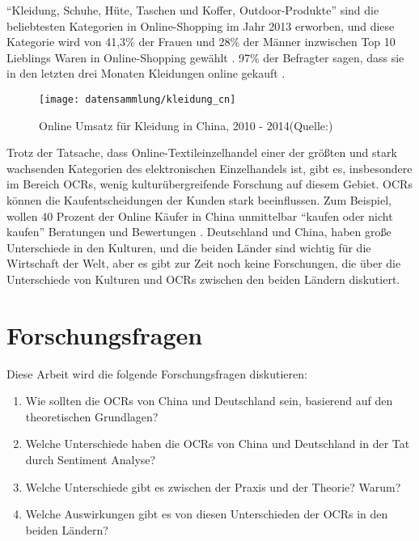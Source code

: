 ``Kleidung, Schuhe, Hüte, Taschen und Koffer, Outdoor-Produkte'' sind die beliebtesten Kategorien in Online-Shopping im Jahr 2013 erworben, und diese Kategorie wird von 41,3\% der Frauen und 28\% der Männer inzwischen Top 10 Lieblings Waren in Online-Shopping gewählt \citep{fung2014china}. 97\% der Befragter sagen, dass sie in den letzten drei Monaten Kleidungen online gekauft \citep{HanaBen-Shabat2015}.

\begin{figure}[htb]
	\begin{center}
		\texttt{[image: datensammlung/kleidung\_cn]}
		\caption[Online Umsatz für Kleidung in China]{Online Umsatz für Kleidung in China, 2010 - 2014(Quelle:\citealp{fung2014china})}
		\label{fig:kleidung_cn}
	\end{center}
\end{figure}

Trotz der Tatsache, dass Online-Textileinzelhandel einer der größten und stark wachsenden Kategorien des elektronischen Einzelhandels ist, gibt es, insbesondere im Bereich \acl{OCRs}, wenig kulturübergreifende Forschung auf diesem Gebiet. \ac{OCRs} können die Kaufentscheidungen der Kunden stark beeinflussen. Zum Beispiel, wollen 40 Prozent der Online Käufer in China unmittelbar ``kaufen oder nicht kaufen'' Beratungen und Bewertungen \citep{HanaBen-Shabat2015}. Deutschland und China, haben große Unterschiede in den Kulturen, und die beiden Länder sind wichtig für die Wirtschaft der Welt, aber es gibt zur Zeit noch keine Forschungen, die über die Unterschiede von Kulturen und \ac{OCRs} zwischen den beiden Ländern diskutiert.
\section{Forschungsfragen}
Diese Arbeit wird die folgende Forschungsfragen diskutieren:
\begin{enumerate}
	\item Wie sollten die \acl{OCRs} von China und Deutschland sein, basierend auf den theoretischen Grundlagen? 
	\item Welche Unterschiede haben die \acl{OCRs} von China und Deutschland in der Tat durch Sentiment Analyse? 
	\item Welche Unterschiede gibt es zwischen der Praxis und der Theorie? Warum?
	\item Welche Auswirkungen gibt es von diesen Unterschieden der \acl{OCRs} in den beiden Ländern?
\end{enumerate}
